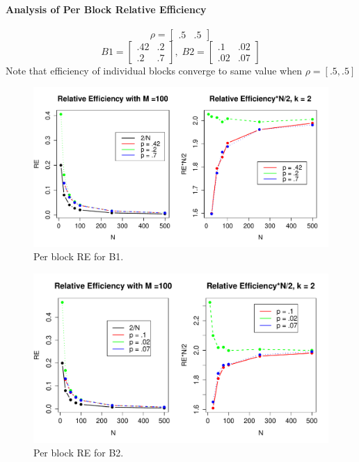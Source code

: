 \documentclass[10pt]{article}
\begin{document}
\paragraph{Analysis of Per Block Relative Efficiency}
\begin{equation*}
\rho = \begin{bmatrix}
.5 & .5
\end{bmatrix}
\end{equation*}
\begin{equation*}
B1 = \begin{bmatrix}
.42 & .2 \\
.2 & .7 
\end{bmatrix},\;
B2 = \begin{bmatrix}
.1 & .02 \\
.02 & .07 
\end{bmatrix}
\end{equation*}
Note that efficiency of individual blocks converge to same value when $\rho = [.5,.5]$
\begin{figure}[!htb]
	\centering
	\includegraphics[width=15.8cm]{RPlot12.pdf}
	\caption{Per block RE for B1.}
	\label{fig:plot1}
\end{figure}
\begin{figure}[!htb]
	\centering
	\includegraphics[width=15.8cm]{RPlot11.pdf}
	\caption{Per block RE for B2.}
	\label{fig:plot1}
\end{figure}
\newpage
\end{document}
